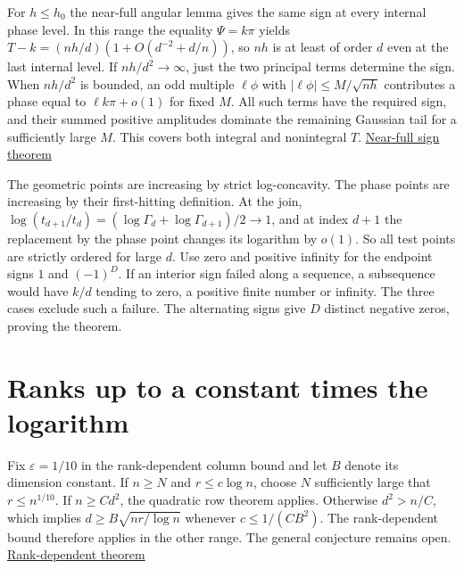 For $h\le h_0$ the near-full angular lemma gives the same sign at every internal phase level. In this range the equality $\Psi=k\pi$ yields $T-k=(nh/d)(1+O(d^{-2}+d/n))$, so $nh$ is at least of order $d$ even at the last internal level. If $nh/d^2\to\infty$, just the two principal terms determine the sign. When $nh/d^2$ is bounded, an odd multiple $\ell\phi$ with $|\ell\phi|\le M/\sqrt{nh}$ contributes a phase equal to $\ell k\pi+o(1)$ for fixed $M$. All such terms have the required sign, and their summed positive amplitudes dominate the remaining Gaussian tail for a sufficiently large $M$. This covers both integral and nonintegral $T$. \hyperref[sec:near-full-all-angular-signs]{Near-full sign theorem}

The geometric points are increasing by strict log-concavity. The phase points are increasing by their first-hitting definition. At the join, $\log(t_{d+1}/t_d)=(\log\Gamma_d+\log\Gamma_{d+1})/2\to1$, and at index $d+1$ the replacement by the phase point changes its logarithm by $o(1)$. So all test points are strictly ordered for large $d$. Use zero and positive infinity for the endpoint signs $1$ and $(-1)^D$. If an interior sign failed along a sequence, a subsequence would have $k/d$ tending to zero, a positive finite number or infinity. The three cases exclude such a failure. The alternating signs give $D$ distinct negative zeros, proving the theorem.

\section{Ranks up to a constant times the logarithm}

Fix $\varepsilon=1/10$ in the rank-dependent column bound and let $B$ denote its dimension constant. If $n\ge N$ and $r\le c\log n$, choose $N$ sufficiently large that $r\le n^{1/10}$. If $n\ge Cd^2$, the quadratic row theorem applies. Otherwise $d^2>n/C$, which implies $d\ge B\sqrt{nr/\log n}$ whenever $c\le 1/(CB^2)$. The rank-dependent bound therefore applies in the other range. The general conjecture remains open. \href{https://github.com/ProgramComputer/open-math-research/tree/ba7ddfd7efb37cac33769f4fdfed749e1b5bf58a/topics/balanced-arrays/dense-regime/rank-dependent}{Rank-dependent theorem}
